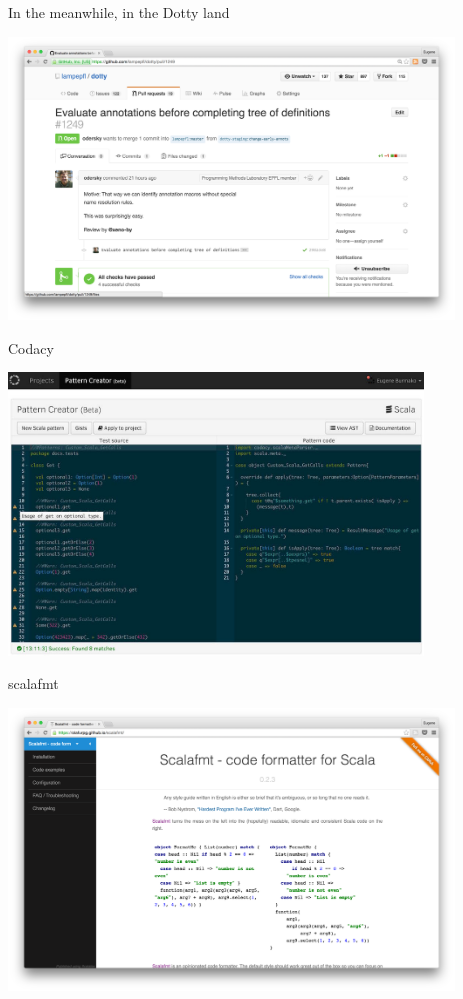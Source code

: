 \documentclass[svgnames,dvipsnames,hyperref={bookmarks=false},usepdftitle=false]{beamer}
\begin{document}
\begin{frame}{In the meanwhile, in the Dotty land}
\vskip20pt
\begin{center}
\includegraphics[height=7.5cm]{dotty-pr.png}
\end{center}
\end{frame}


\begin{frame}[c, fragile]{Codacy}
\begin{center}
\includegraphics[height=7.5cm]{codacy.jpg}
\end{center}
\end{frame}

\begin{frame}[c, fragile]{scalafmt}
\vskip20pt
\begin{center}
\includegraphics[height=7.5cm]{scalafmt.png}
\end{center}
\end{frame}
\end{document}
